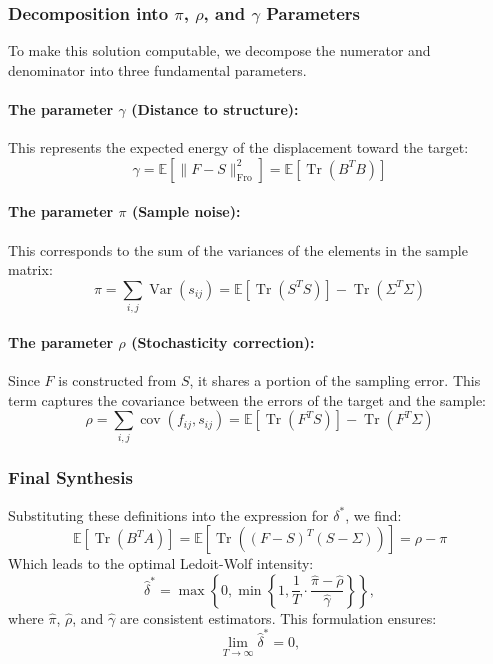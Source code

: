 \documentclass[11pt,a4paper]{article}
\begin{document}
\subsubsection{Decomposition into \texorpdfstring{$\pi$, $\rho$, and $\gamma$}{π, ρ, and γ} Parameters}
To make this solution computable, we decompose the numerator and denominator into three fundamental parameters.

\paragraph{The parameter $\gamma$ (Distance to structure):}
This represents the expected energy of the displacement toward the target:
\begin{equation}
\gamma = \mathbb{E}[\|F - S\|^2_{\text{Fro}}] = \mathbb{E}[\operatorname{Tr}(B^T B)]
\end{equation}

\paragraph{The parameter $\pi$ (Sample noise):}
This corresponds to the sum of the variances of the elements in the sample matrix:
\begin{equation}
\pi = \sum_{i,j} \operatorname{Var}(s_{ij}) = \mathbb{E}[\operatorname{Tr}(S^T S)] - \operatorname{Tr}(\Sigma^T \Sigma)
\end{equation}

\paragraph{The parameter $\rho$ (Stochasticity correction):}
Since $F$ is constructed from $S$, it shares a portion of the sampling error. This term captures the covariance between the errors of the target and the sample:
\begin{equation}
\rho = \sum_{i,j} \operatorname{cov}(f_{ij}, s_{ij}) = \mathbb{E}[\operatorname{Tr}(F^T S)] - \operatorname{Tr}(F^T \Sigma)
\end{equation}

\subsubsection{Final Synthesis}
Substituting these definitions into the expression for $\delta^*$, we find:
\begin{equation}
\mathbb{E}[\operatorname{Tr}(B^T A)] = \mathbb{E}[\operatorname{Tr}((F-S)^T(S-\Sigma))] = \rho - \pi
\end{equation}
Which leads to the optimal Ledoit-Wolf intensity:
\begin{equation}
    \hat{\delta}^* = \max \left\{ 0, \min \left\{ 1, \frac{1}{T} \cdot \frac{\hat{\pi} - \hat{\rho}}{\hat{\gamma}} \right\} \right\},
\end{equation}
where $\hat{\pi}$, $\hat{\rho}$, and $\hat{\gamma}$ are consistent estimators. This formulation ensures:
\begin{equation}
\lim_{T \to \infty} \hat{\delta}^* = 0,
\end{equation}
\end{document}
